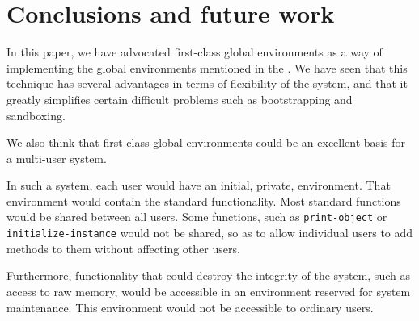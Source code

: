 \section{Conclusions and future work}

In this paper, we have advocated first-class global environments as a
way of implementing the global environments mentioned in the \hs{}.
We have seen that this technique has several advantages in terms of
flexibility of the system, and that it greatly simplifies certain
difficult problems such as bootstrapping and sandboxing.

We also think that first-class global environments could be an
excellent basis for a multi-user \commonlisp{} system.

In such a system, each user would have an initial, private,
environment.  That environment would contain the standard
\commonlisp{} functionality.  Most standard \commonlisp{} functions
would be shared between all users.  Some functions, such as
\texttt{print-object} or \texttt{initialize-instance} would not be
shared, so as to allow individual users to add methods to them without
affecting other users.

Furthermore, functionality that could destroy the integrity of the
system, such as access to raw memory, would be accessible in an
environment reserved for system maintenance.  This environment would
not be accessible to ordinary users.
